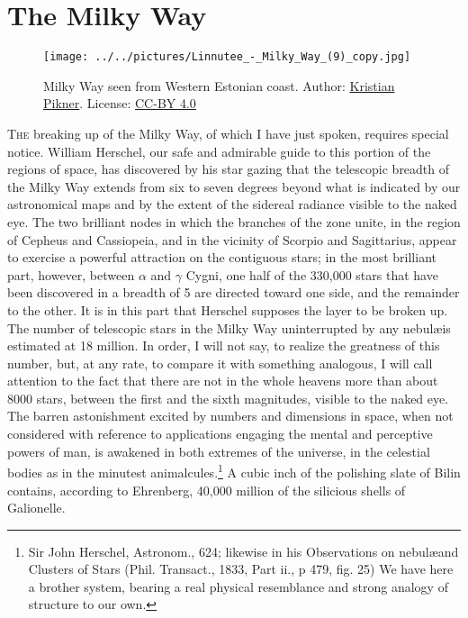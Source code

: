 
\chapter{The Milky Way}

\begin{figure}[h]
\vspace{-40pt}
    \centering
    \texttt{[image: ../../pictures/Linnutee\_-\_Milky\_Way\_(9)\_copy.jpg]}
    \caption{\footnotesize Milky Way seen from Western Estonian coast. Author:
    \href{https://commons.wikimedia.org/wiki/File:Linnutee_-_Milky_Way_(9)_copy.jpg}{Kristian Pikner}.
    License: \href{https://creativecommons.org/licenses/by-sa/4.0/deed.en}{CC-BY 4.0}}
\end{figure}
\clearpage

\lettrine[lines=4]{\goudy T}{he} breaking up of the Milky Way, of which I have just spoken, requires special notice. William Herschel, our safe and admirable guide to this portion of the regions of space, has discovered by his star gazing that the telescopic breadth of the Milky Way extends from six to seven degrees beyond what is indicated by our astronomical maps and by the extent of the sidereal radiance visible to the naked eye. The two brilliant nodes in which the branches of the zone unite, in the region of Cepheus and Cassiopeia, and in the vicinity of Scorpio and Sagittarius, appear to exercise a powerful attraction on the contiguous stars; in the most brilliant part, however, between $\alpha$ and $\gamma$ Cygni, one half of the 330,000 stars that have been discovered in a breadth of 5 are directed toward one side, and the remainder to the other. It is in this part that Herschel supposes the layer to be broken up. The number of telescopic stars in the Milky Way uninterrupted by any nebul\ae is estimated at 18 million. In order, I will not say, to realize the greatness of this number, but, at any rate, to compare it with something analogous, I will call attention to the fact that there are not in the whole heavens more than about 8000 stars, between the first and the sixth magnitudes, visible to the naked eye. The barren astonishment excited by numbers and dimensions in space, when not considered with reference to applications engaging the mental and perceptive powers of man, is awakened in both extremes of the universe, in the celestial bodies as in the minutest animalcules.\footnote{Sir John Herschel, Astronom., 624; likewise in his Observations on nebul\ae and Clusters of Stars (Phil. Transact., 1833, Part ii., p 479, fig. 25) We have here a brother system, bearing a real physical resemblance and strong analogy of structure to our own.} A cubic inch of the polishing slate of Bilin contains, according to Ehrenberg, 40,000 million of the silicious shells of Galionelle.

